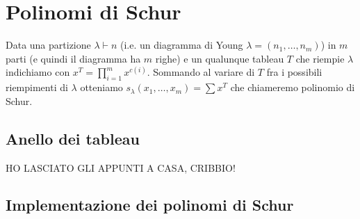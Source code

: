 \chapter{Polinomi di Schur}

\begin{defn}
Data una partizione $\lambda \vdash n$ (i.e. un diagramma di Young
$\lambda = (n_1, \ldots, n_m)$) in $m$ parti (e quindi il diagramma ha
$m$ righe) e un qualunque tableau $T$ che riempie $\lambda$ indichiamo
con $x^T = \prod\limits_{i = 1}^m x^{c(i)}$. Sommando al variare di
$T$ fra i possibili riempimenti di $\lambda$ otteniamo
\begin{math}
s_\lambda(x_1,\ldots,x_m) = \sum x^T
\end{math}
che chiameremo polinomio di Schur.
\end{defn}

\section{Anello dei tableau}

HO LASCIATO GLI APPUNTI A CASA, CRIBBIO!

\section{Implementazione dei polinomi di Schur}


